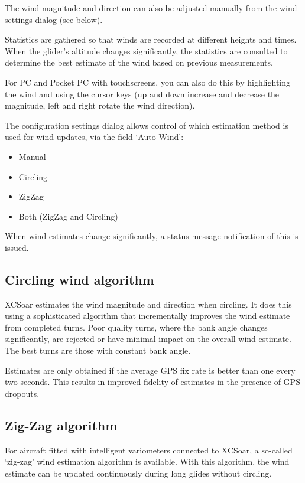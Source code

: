 \documentclass[a4paper,12pt]{refrep}
\begin{document}
The wind magnitude and direction can also be adjusted manually from the
wind settings dialog (see below).  

Statistics are gathered so that winds are recorded at different
heights and times.  When the glider's altitude changes significantly,
the statistics are consulted to determine the best estimate of the
wind based on previous measurements.

For PC and Pocket PC with touchscreens, you can
also do this by highlighting the wind {\InfoBox} and using the cursor
keys (up and down increase and decrease the magnitude, left and right
rotate the wind direction).

The configuration  settings dialog allows control of which
estimation method is used for wind updates, via the field `Auto Wind':
\begin{itemize}
\item Manual
\item Circling
\item ZigZag
\item Both (ZigZag and Circling)
\end{itemize}

When wind estimates change significantly, a status message
notification of this is issued.

\subsection*{Circling wind algorithm}

XCSoar estimates the wind magnitude and direction when circling.  It
does this using a sophisticated algorithm that incrementally improves
the wind estimate from completed turns.  Poor quality turns, where
the bank angle changes significantly, are rejected or have minimal
impact on the overall wind estimate.  The best turns are those with
constant bank angle.

Estimates are only obtained if the average GPS fix rate is better than
one every two seconds.  This results in improved fidelity of estimates
in the presence of GPS dropouts.


\subsection*{Zig-Zag algorithm}

For aircraft fitted with intelligent variometers connected to XCSoar,
a so-called `zig-zag' wind estimation algorithm is available.  With
this algorithm, the wind estimate can be updated continuously during
long glides without circling.
\end{document}
